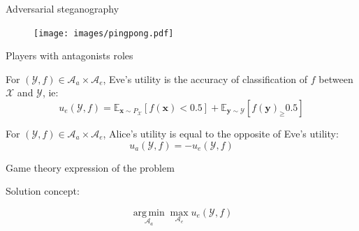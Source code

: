 \documentclass[10pt]{beamer}
\DeclareMathOperator*{\argmin}{arg\,min} %
\begin{document}





\begin{frame}{Adversarial steganography}
  \begin{figure}
        \texttt{[image: images/pingpong.pdf]}
    \end{figure}
\end{frame}



\begin{frame}{Players with antagonists roles}


\begin{tcolorbox}[colback=lightgreen,colframe=greentheme,title=\textbf{Definition} (Eve's utility)]
For $(\mathcal{Y}, f)  \in \mathcal{A}_a \times \mathcal{A}_e$, Eve's utility is the accuracy of classification of $f$ between $\mathcal{X}$ and $\mathcal{Y}$, ie:
\begin{equation}
    u_e(\mathcal{Y}, f) = \mathbb{E}_{\mathbf{x}\sim P_{\mathcal{X}}}[f(\mathbf{x}) < 0.5] + \mathbb{E}_{\mathbf{y} \sim \mathcal{Y}}[f(\mathbf{y})_ \geq 0.5]
\end{equation}
\end{tcolorbox}


\pause


\begin{tcolorbox}[colback=lightgreen,colframe=greentheme,title=\textbf{Definition} (Alice's utility)]
For $(\mathcal{Y}, f)  \in \mathcal{A}_a \times \mathcal{A}_e$, Alice's utility is equal to the opposite of Eve's utility:
\begin{equation}
    u_a(\mathcal{Y}, f) = - u_e(\mathcal{Y}, f)
\end{equation}
\end{tcolorbox}

\end{frame}

\begin{frame}{Game theory expression of the problem}

Solution concept:

\alert{
\begin{equation}
\underset{\mathcal{A}_a}{\argmin} \max_{\mathcal{A}_e} u_e(\mathcal{Y}, f)
\label{eq:minmax}
\end{equation}}

\pause


    
\end{frame}
\end{document}
